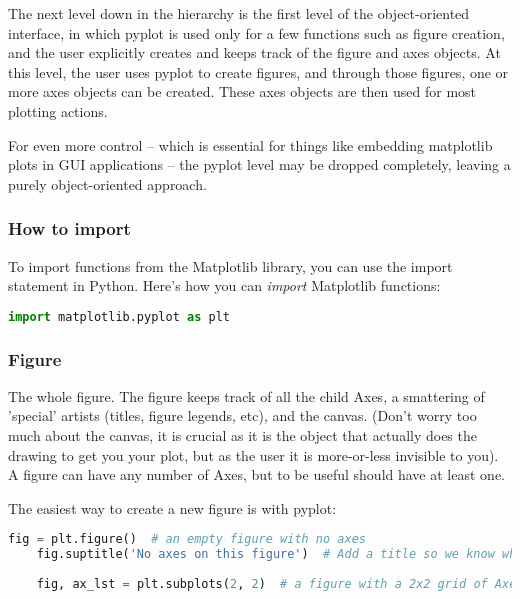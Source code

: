 The next level down in the hierarchy is the first level of the object-oriented interface, in which pyplot is used only for a few functions such as figure creation, and the user explicitly creates and keeps track of the figure and axes objects. At this level, the user uses pyplot to create figures, and through those figures, one or more axes objects can be created. These axes objects are then used for most plotting actions.

For even more control -- which is essential for things like embedding matplotlib plots in GUI applications -- the pyplot level may be dropped completely, leaving a purely object-oriented approach.

\subsubsection{How to import}

To import functions from the Matplotlib library, you can use the import statement in Python. Here's how you can \textit{import} Matplotlib functions:

\begin{lstlisting}[language=Python, style=pythonstyle, caption={Importing matplotlib for plotting}, label={code:import-matplotlib}]
	import matplotlib.pyplot as plt
\end{lstlisting}


\subsubsection{Figure}

The whole figure. The figure keeps track of all the child Axes, a smattering of 'special' artists (titles, figure legends, etc), and the canvas. (Don't worry too much about the canvas, it is crucial as it is the object that actually does the drawing to get you your plot, but as the user it is more-or-less invisible to you). A figure can have any number of Axes, but to be useful should have at least one.

The easiest way to create a new figure is with pyplot:

\begin{lstlisting}[language=Python, style=pythonstyle, caption={Creating a figure with matplotlib}, label={code:create-figure}]
	fig = plt.figure()  # an empty figure with no axes
	fig.suptitle('No axes on this figure')  # Add a title so we know which it is
	
	fig, ax_lst = plt.subplots(2, 2)  # a figure with a 2x2 grid of Axes
\end{lstlisting}



